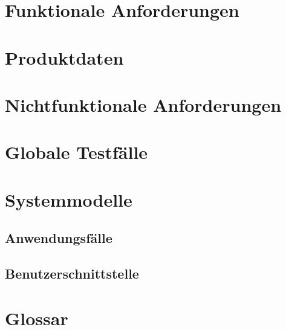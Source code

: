 \documentclass[parskip=full]{scrartcl}
\begin{document}
\section{Funktionale Anforderungen}

\section{Produktdaten}

\section{Nichtfunktionale Anforderungen}

\section{Globale Testf\"alle}

\section{Systemmodelle}
\subsection{Anwendungsf\"alle}
\subsection{Benutzerschnittstelle}

\section{Glossar}
\end{document}
